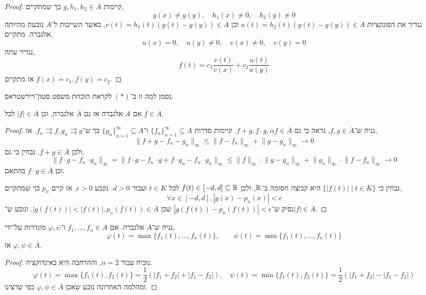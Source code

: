 \begin{proof}
	קיימות $g, h_1, h_2 \in A$ כך שמתקיים,
	\[
		g(x) \ne g(y),
		\quad h_1(x) \ne 0,
		\quad h_2(y) \ne 0
	\]
	נגדיר את הפונקציות $u(t) = h_2(t) (g(t) - g(y)) \in A$ וכן $v(t) = h_1(t) (g(t) - g(y)) \in A$, כאשר השייכות ל־$A$ נובעת מהיותה אלגברה.
	מתקיים,
	\[
		u(x) = 0,
		\quad u(y) \ne 0,
		\quad v(x) \ne 0,
		\quad v(y) = 0
	\]
	נגדיר עתה,
	\[
		f(t) = c_1 \frac{v(t)}{v(x)} + c_2 \frac{u(t)}{u(y)}
	\]
	אז מתקיים $f(x) = c_1, f(y) = c_2$.
\end{proof}
נסמן למה זו ב־$(*)$ לקראת הוכחת משפט סטון־ויירשטראס.
\begin{lemma}
	אם $A$ אלגברה אז גם $\overline{A}$ אלגברה,
	וכן $|f| \in \overline{A}$ לכל $f \in A$.
\end{lemma}
\begin{proof}
	נניח ש־$f, g \in \overline{A}$, נראה כי גם $f + g, f \cdot g, \alpha f \in \overline{A}$.
	קיימות סדרות ${\{ f_n \}}_{n = 1}^\infty \subseteq A$ ו־${\{ g_n \}}_{n = 1}^\infty \subseteq A$ כך ש־$f_n \rightrightarrows f, g_n \rightrightarrows g$.
	אז,
	\[
		\lVert f + g - f_n - g_n \rVert_\infty
		\le \lVert f - f_n \rVert_\infty + \lVert g - g_n \rVert_\infty \to 0
	\]
	ולכן $f + g \in \overline{A}$.
	נבחין כי גם,
	\[
		\lVert f \cdot g - f_n \cdot g_n \rVert_\infty
		= \lVert f \cdot g - f_n \cdot g + f \cdot g_n - f_n \cdot g_n \rVert_\infty
		\le \lVert f \rVert_\infty \cdot \lVert g - g_n \rVert_\infty + \lVert g_n \rVert_\infty \cdot \lVert f - f_n \rVert_\infty
		\to 0
	\]
	וכן $f \cdot g \in \overline{A}$ בהתאם.

	נבחין כי $\{ |f(t)| \mid t \in K \}$ היא קבוצה חסומה ב־$\mathbb{R}$, ולכן $f(t) \in [-d, d] \subseteq \mathbb{R}$ לכל $t \in K$ ועבור $d > 0$.
	נקבע $\epsilon > 0$, אז קיים $p_n$ כך שמתקיים,
	\[
		\forall x \in [-d, d],
		|g(x) - p_n(x)| < \epsilon
	\]
	נסיק ש־$|g(f(t)) - p_n(f(t))| < \epsilon$ שכן $|g(f(t))| < |f(t)|, p_n(f(t)) \in \overline{A}$, ונובע ש־$|f| \in \overline{A}$.
\end{proof}
\begin{lemma}
	נניח ש־$A$ אלגברה.
	אם $f_1, \ldots, f_n \in A$ ו־$\varphi, \psi$ מוגדרות על־ידי,
	\[
		\varphi(t) = \max\{ f_1(t), \ldots, f_n(t) \},
		\qquad
		\psi(t) = \min\{ f_1(t), \ldots, f_n(t) \}
	\]
	אז $\varphi, \psi \in \overline{A}$.
\end{lemma}
\begin{proof}
	נוכיח עבור $n = 2$, וההרחבה היא באינדוקציה.
	\[
		\varphi(t) = \max\{ f_1(t), f_2(t) \} = \frac{1}{2}(|f_1 + f_2| + |f_1 - f_2|),
		\quad
		\psi(t) = \min\{ f_1(t), f_2(t) \} = \frac{1}{2}(|f_1 + f_2| - |f_1 - f_2|)
	\]
	ומהלמה האחרונה נובע שאכן $\varphi, \psi \in \overline{A}$ כפי שרצינו.
\end{proof}
